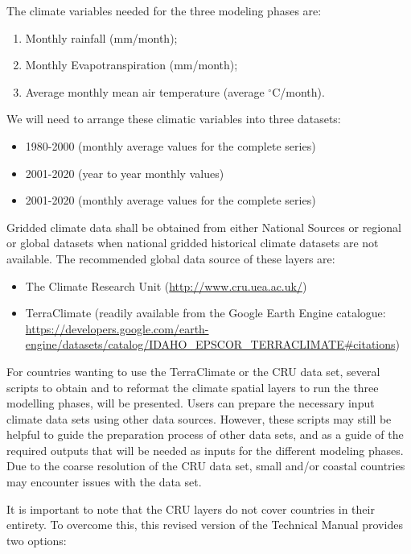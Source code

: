 \documentclass[
  10pt,
  b5paper,
]{book}
\providecommand{\tightlist}{%
  \setlength{\itemsep}{0pt}\setlength{\parskip}{0pt}}
\begin{document}
The climate variables needed for the three modeling phases are:

\begin{enumerate}
\def\labelenumi{\arabic{enumi}.}
\tightlist
\item
  Monthly rainfall (mm/month);\\
\item
  Monthly Evapotranspiration (mm/month);
\item
  Average monthly mean air temperature (average \(^\circ\)C/month).
\end{enumerate}

We will need to arrange these climatic variables into three datasets:

\begin{itemize}
\tightlist
\item
  1980-2000 (monthly average values for the complete series)
\item
  2001-2020 (year to year monthly values)
\item
  2001-2020 (monthly average values for the complete series)
\end{itemize}

Gridded climate data shall be obtained from either National Sources or regional or global datasets when national gridded historical climate datasets are not available. The recommended global data source of these layers are:

\begin{itemize}
\tightlist
\item
  The Climate Research Unit (\url{http://www.cru.uea.ac.uk/})
\item
  TerraClimate (readily available from the Google Earth Engine catalogue: \url{https://developers.google.com/earth-engine/datasets/catalog/IDAHO_EPSCOR_TERRACLIMATE\#citations})
\end{itemize}

For countries wanting to use the TerraClimate or the CRU data set, several scripts to obtain and to reformat the climate spatial layers to run the three modelling phases, will be presented. Users can prepare the necessary input climate data sets using other data sources. However, these scripts may still be helpful to guide the preparation process of other data sets, and as a guide of the required outputs that will be needed as inputs for the different modeling phases. Due to the coarse resolution of the CRU data set, small and/or coastal countries may encounter issues with the data set.

It is important to note that the CRU layers do not cover countries in their entirety. To overcome this, this revised version of the Technical Manual provides two options:
\end{document}
